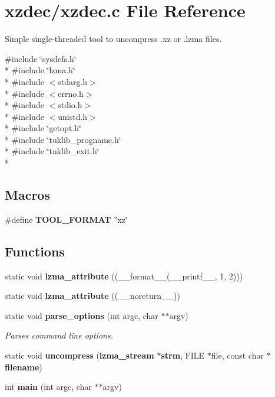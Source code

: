 \section{xzdec/xzdec.c File Reference}
\label{xzdec_8c}


Simple single-\/threaded tool to uncompress .xz or .lzma files.  


{\ttfamily \#include \char`\"{}sysdefs.\-h\char`\"{}}\\*
{\ttfamily \#include \char`\"{}lzma.\-h\char`\"{}}\\*
{\ttfamily \#include $<$stdarg.\-h$>$}\\*
{\ttfamily \#include $<$errno.\-h$>$}\\*
{\ttfamily \#include $<$stdio.\-h$>$}\\*
{\ttfamily \#include $<$unistd.\-h$>$}\\*
{\ttfamily \#include \char`\"{}getopt.\-h\char`\"{}}\\*
{\ttfamily \#include \char`\"{}tuklib\-\_\-progname.\-h\char`\"{}}\\*
{\ttfamily \#include \char`\"{}tuklib\-\_\-exit.\-h\char`\"{}}\\*
\subsection*{Macros}
\begin{DoxyCompactItemize}
\item 
\#define {\bfseries T\-O\-O\-L\-\_\-\-F\-O\-R\-M\-A\-T}~\char`\"{}xz\char`\"{}\label{xzdec_8c_aeb6169de58908cc8d54b70e9caba325c}

\end{DoxyCompactItemize}
\subsection*{Functions}
\begin{DoxyCompactItemize}
\item 
static void {\bfseries lzma\-\_\-attribute} ((\-\_\-\-\_\-format\-\_\-\-\_\-(\-\_\-\-\_\-printf\-\_\-\-\_\-, 1, 2)))\label{xzdec_8c_a7407a84e0f83a82d1e7bdee869504eff}

\item 
static void {\bfseries lzma\-\_\-attribute} ((\-\_\-\-\_\-noreturn\-\_\-\-\_\-))\label{xzdec_8c_a1957d0c8f6ec2eb4950e67226425ee7c}

\item 
static void {\bf parse\-\_\-options} (int argc, char $\ast$$\ast$argv)
\begin{DoxyCompactList}\small\item\em Parses command line options. \end{DoxyCompactList}\item 
static void {\bfseries uncompress} ({\bf lzma\-\_\-stream} $\ast${\bf strm}, F\-I\-L\-E $\ast$file, const char $\ast${\bf filename})\label{xzdec_8c_a392ba619796fa4e882d5050ee362e7d4}

\item 
int {\bfseries main} (int argc, char $\ast$$\ast$argv)\label{xzdec_8c_a3c04138a5bfe5d72780bb7e82a18e627}

\end{DoxyCompactItemize}
